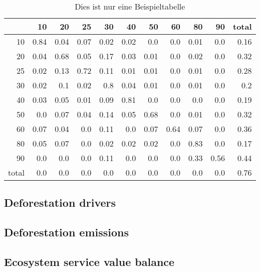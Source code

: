 \begin{table}
	\centering
	\caption{Dies ist nur eine Beispieltabelle}
	\label{tab:rt3}
	\begin{tabular}{r|rrrrrrrrr|r}
		   & 10 & 20 & 25 & 30 & 40 & 50 & 60 & 80 & 90 & total \\\hline 
		10 & 0.84 & 0.04 & 0.07 & 0.02 & 0.02 & 0.0 & 0.0 & 0.01 & 0.0 & 0.16 \\ 
		20 & 0.04 & 0.68 & 0.05 & 0.17 & 0.03 & 0.01 & 0.0 & 0.02 & 0.0 & 0.32 \\ 
		25 & 0.02 & 0.13 & 0.72 & 0.11 & 0.01 & 0.01 & 0.0 & 0.01 & 0.0 & 0.28 \\ 
		30 & 0.02 & 0.1 & 0.02 & 0.8 & 0.04 & 0.01 & 0.0 & 0.01 & 0.0 & 0.2 \\ 
		40 & 0.03 & 0.05 & 0.01 & 0.09 & 0.81 & 0.0 & 0.0 & 0.0 & 0.0 & 0.19 \\ 
		50 & 0.0 & 0.07 & 0.04 & 0.14 & 0.05 & 0.68 & 0.0 & 0.01 & 0.0 & 0.32 \\ 
		60 & 0.07 & 0.04 & 0.0 & 0.11 & 0.0 & 0.07 & 0.64 & 0.07 & 0.0 & 0.36 \\ 
		80 & 0.05 & 0.07 & 0.0 & 0.02 & 0.02 & 0.02 & 0.0 & 0.83 & 0.0 & 0.17 \\ 
		90 & 0.0 & 0.0 & 0.0 & 0.11 & 0.0 & 0.0 & 0.0 & 0.33 & 0.56 & 0.44 \\\hline 
		total & 0.0 & 0.0 & 0.0 & 0.0 & 0.0 & 0.0 & 0.0 & 0.0 & 0.0 & 0.76
	\end{tabular}
\end{table}

\subsection{Deforestation drivers}
\subsection{Deforestation emissions}
\subsection{Ecosystem service value balance}
